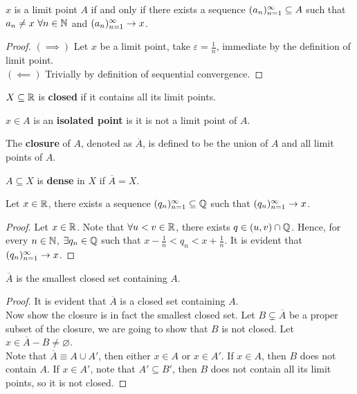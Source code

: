 \documentclass[11pt]{article}
\begin{document}
	\begin{theorem}
		$x$ is a limit point $A$ if and only if there exists a sequence $({a}_{n})_{{n}=1}^\infty \subseteq A$ such that \ul{$a_n \neq x\ \forall n \in \mathbb{N}$} and $({a}_{n})_{{n}=1}^\infty \to x$.
	\end{theorem}
	\begin{proof}
		$(\implies)$ Let $x$ be a limit point, take $\varepsilon = \frac{1}{n}$, immediate by the definition of limit point. \\
		$(\impliedby)$ Trivially by definition of sequential convergence.
	\end{proof}
	
	\begin{definition}
		$X \subseteq \mathbb{R}$ is \textbf{closed} if it contains all its limit points.
	\end{definition}
	
	\begin{definition}
		$x \in A$ is an \textbf{isolated point} is it is not a limit point of $A$.
	\end{definition}

	\begin{definition}
		The \textbf{closure} of $A$, denoted as $\overline{A}$, is defined to be the union of $A$ and all limit points of $A$.
	\end{definition}

	\begin{definition}
		$A \subseteq X$ is \textbf{dense} in $X$ if $\overline{A} = X$.
	\end{definition}
	
	\begin{theorem}
		Let $x \in \mathbb{R}$, there exists a sequence $({q}_{n})_{{n}=1}^\infty \subseteq \mathbb{Q}$ such that $({q}_{n})_{{n}=1}^\infty \to x$.
	\end{theorem}
	
	\begin{proof}
		Let $x \in \mathbb{R}$. Note that $\forall u < v \in \mathbb{R}$, there exists $q \in (u, v) \cap \mathbb{Q}$.
		Hence, for every $n \in \mathbb{N}$, $\exists q_n \in \mathbb{Q}$ such that $x - \frac{1}{n} < q_n < x + \frac{1}{n}$. It is evident that $({q}_{n})_{{n}=1}^\infty \to x$.
	\end{proof}
	
	\begin{lemma}
		$\overline{A}$ is the smallest closed set containing $A$.
	\end{lemma}
	\begin{proof}
		It is evident that $\overline{A}$ is a closed set containing $A$. \\
		Now show the closure is in fact the smallest closed set. Let $B \subsetneq \overline{A}$ be a proper subset of the closure, we are going to show that $B$ is not closed. Let $x \in \overline{A} - B \neq \varnothing$.\\
		Note that $\overline{A} \equiv A \cup A'$, then either $x \in A$ or $x \in A'$. If $x \in A$, then $B$ does not contain $A$. If $x \in A'$, note that $A' \subseteq B'$, then $B$ does not contain all its limit points, so it is not closed.
	\end{proof}
	
\end{document}
